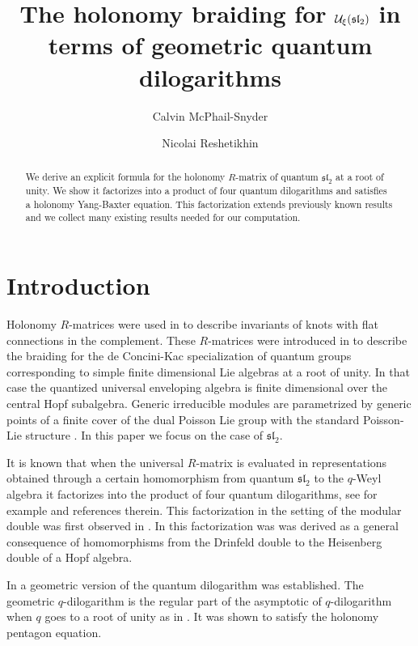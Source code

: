 \documentclass{sl2ams}
\title[The holonomy braiding for \(\U_\xi(\mathfrak{sl}_2)\)]{The holonomy braiding for \(\U_\xi(\mathfrak{sl}_2)\) in terms of geometric quantum dilogarithms}
\author{Calvin McPhail-Snyder}
\author{Nicolai Reshetikhin}
\numberwithin{equation}{section}
\begin{document}
\begin{abstract}
  We derive an explicit formula for the holonomy $R$-matrix of quantum $\mathfrak{sl}_2$ at a root of unity.
  We show it factorizes into a product of four quantum dilogarithms and satisfies a holonomy Yang-Baxter equation.
  This factorization extends previously known results and we collect many existing results needed for our computation.
\end{abstract}

\maketitle

\tableofcontents

\section{Introduction}
\label{sec:Introduction}

Holonomy $R$-matrices were used in \cite{Kashaev2005} to describe invariants of knots with flat connections in the complement.
These $R$-matrices were introduced in \cite{Reshetikhin1995} to describe the braiding for the de Concini-Kac specialization of quantum groups corresponding to simple finite dimensional Lie algebras at a root of unity. 
In that case the quantized universal enveloping algebra is finite dimensional over the central Hopf subalgebra.
Generic irreducible modules are parametrized by generic points of a finite cover of the dual Poisson Lie group with the standard Poisson-Lie structure \cite{DeConcini1990}.
In this paper we focus on the case of $\mathfrak{sl}_2$.

It is known that when the universal \(R\)-matrix is evaluated in representations obtained through a certain homomorphism from quantum
$\mathfrak{sl}_2$ to the \(q\)-Weyl algebra it factorizes into the product of
four quantum dilogarithms, see for example \cite{Fadeev2000,Schrader2019} and references therein. 
This factorization in the setting of the modular double was first observed 
in \cite{Fadeev2000}. In \cite{Kashaev1996} this factorization was was derived as a general consequence of homomorphisms from the Drinfeld double to the Heisenberg double of a Hopf algebra. 

In \cite{Faddeev1994, Bazhanov1995} a geometric version of the quantum dilogarithm 
was established. The geometric \(q\)-dilogarithm is the regular part of the asymptotic of \(q\)-dilogarithm when $q$ goes to a root of unity as in \cite{Bazhanov1995}. It was shown to satisfy the holonomy pentagon equation. 
\end{document}
